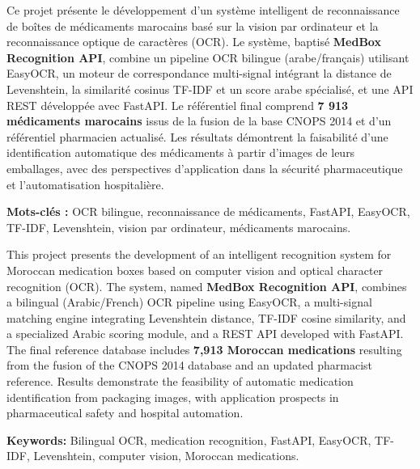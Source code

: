 \documentclass[12pt,a4paper]{report}
\begin{document}
\begin{tcolorbox}[colback=primary!5,colframe=primary,title=\textbf{R\'esum\'e (Fran\c{c}ais)},arc=6pt]

Ce projet pr\'esente le d\'eveloppement d'un syst\`eme intelligent de reconnaissance de bo\^ites de m\'edicaments marocains bas\'e sur la vision par ordinateur et la reconnaissance optique de caract\`eres (OCR). Le syst\`eme, baptis\'e \textbf{MedBox Recognition API}, combine un pipeline OCR bilingue (arabe/fran\c{c}ais) utilisant EasyOCR, un moteur de correspondance multi-signal int\'egrant la distance de Levenshtein, la similarit\'e cosinus TF-IDF et un score arabe sp\'ecialis\'e, et une API REST d\'evelopp\'ee avec FastAPI. Le r\'ef\'erentiel final comprend \textbf{7 913 m\'edicaments marocains} issus de la fusion de la base CNOPS 2014 et d'un r\'ef\'erentiel pharmacien actualis\'e. Les r\'esultats d\'emontrent la faisabilit\'e d'une identification automatique des m\'edicaments \`a partir d'images de leurs emballages, avec des perspectives d'application dans la s\'ecurit\'e pharmaceutique et l'automatisation hospitali\`ere.

\medskip
\textbf{Mots-cl\'es :} OCR bilingue, reconnaissance de m\'edicaments, FastAPI, EasyOCR, TF-IDF, Levenshtein, vision par ordinateur, m\'edicaments marocains.
\end{tcolorbox}

\vspace{0.5cm}

\begin{tcolorbox}[colback=teal!5,colframe=teal,title=\textbf{Abstract (English)},arc=6pt]

This project presents the development of an intelligent recognition system for Moroccan medication boxes based on computer vision and optical character recognition (OCR). The system, named \textbf{MedBox Recognition API}, combines a bilingual (Arabic/French) OCR pipeline using EasyOCR, a multi-signal matching engine integrating Levenshtein distance, TF-IDF cosine similarity, and a specialized Arabic scoring module, and a REST API developed with FastAPI. The final reference database includes \textbf{7,913 Moroccan medications} resulting from the fusion of the CNOPS 2014 database and an updated pharmacist reference. Results demonstrate the feasibility of automatic medication identification from packaging images, with application prospects in pharmaceutical safety and hospital automation.

\medskip
\textbf{Keywords:} Bilingual OCR, medication recognition, FastAPI, EasyOCR, TF-IDF, Levenshtein, computer vision, Moroccan medications.
\end{tcolorbox}
\end{document}

